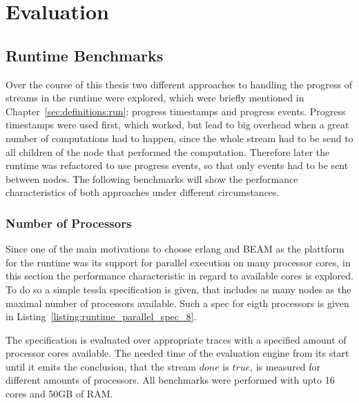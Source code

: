 %
\chapter{Evaluation}
\label{sec:evaluation}

\section{Runtime Benchmarks}
\label{sec:evaluation:runtime_benchmarks}

Over the course of this thesis two different approaches to handling the progress of streams in the runtime were explored, which were briefly mentioned in Chapter~\ref{sec:definitions:run}: progress timestamps and progress events.
Progress timestamps were used first, which worked, but lead to big overhead when a great number of computations had to happen, since the whole stream had to be send to all children of the node that performed the computation.
Therefore later the runtime was refactored to use progress events, so that only events had to be sent between nodes.
The following benchmarks will show the performance characteristics of both approaches under different circumstances.

\subsection{Number of Processors}

Since one of the main motivations to choose erlang and BEAM as the plattform for the runtime was its support for parallel execution on many processor cores, in this section the performance characteristic in regard to available cores is explored.
To do so a simple \gls{tessla} specification is given, that includes as many nodes as the maximal number of processors available.
Such a spec for eigth processors is given in Listing~\ref{listing:runtime_parallel_spec_8}.

\begin{figure}
  
\end{figure}

The specification is evaluated over appropriate traces with a specified amount of processor cores available.
The needed time of the evaluation engine from its start until it emits the conclusion, that the stream \(\mathit{done}\) is \(\mathit{true}\), is measured for different amounts of processors.
All benchmarks were performed with upto 16 cores and 50GB of RAM.

